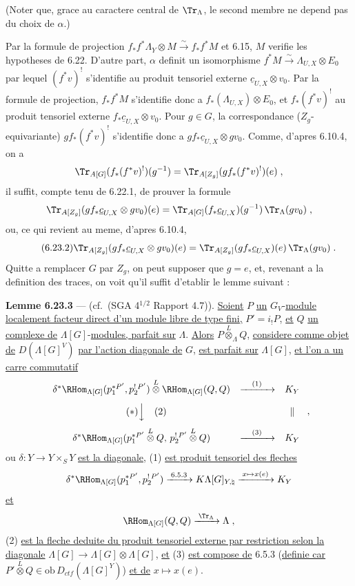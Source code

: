(Noter que, grace au caractere central de $\Tr_\Lambda$, le second membre ne depend pas du choix de $\alpha$.)

Par la formule de projection $f_* f^*\Lambda_Y \otimes M \xrightarrow{\sim} f_* f^* M$ et 6.15, $M$ verifie les hypotheses de 6.22. D'autre part, $\alpha$ definit un isomorphisme $f^* M \xrightarrow{\sim} \Lambda_{U,X} \otimes E_0$ par lequel $(f^* v)^!$ s'identifie au produit tensoriel externe $\underline{c}_{U,X} \otimes v_0$. Par la formule de projection, $f_* f^* M$ s'identifie donc a $f_*(\Lambda_{U,X}) \otimes E_0$, et $f_*(f^* v)^!$ au produit tensoriel externe $f_*\underline{c}_{U,X} \otimes v_0$. Pour $g \in G$, la correspondance ($Z_g$-equivariante) $gf_*(f^* v)^!$ s'identifie donc a $gf_*\underline{c}_{U,X} \otimes gv_0$. Comme, d'apres 6.10.4, on a
\[
\Tr_{A[G]}(f_*(f^* v)^!)(g^{-1}) = \Tr_{A[Z_g]}(gf_*(f^* v)^!)(e)\;,
\]
il suffit, compte tenu de 6.22.1, de prouver la formule
\[
\Tr_{A[Z_g]}(gf_*\underline{c}_{U,X} \otimes gv_0)(e) = \Tr_{A[G]}(f_*\underline{c}_{U,X})(g^{-1})\,\Tr_\Lambda(gv_0)\;,
\]
ou, ce qui revient au meme, d'apres 6.10.4,
\begin{equation}\tag{6.23.2}
\Tr_{A[Z_g]}(gf_*\underline{c}_{U,X} \otimes gv_0)(e) = \Tr_{A[Z_g]}(gf_*\underline{c}_{U,X})(e)\,\Tr_\Lambda(gv_0)\;.
\end{equation}
Quitte a remplacer $G$ par $Z_g$, on peut supposer que $g=e$, et, revenant a la definition des traces, on voit qu'il suffit d'etablir le lemme suivant :

\medskip
\noindent\textbf{Lemme 6.23.3} --- (cf.\ (SGA 4$^{1/2}$ Rapport 4.7)). \underline{Soient} $P$ \underline{un} $G_V$-\underline{module localement facteur direct d'un module libre de type fini,} $P' = i_!P$, \underline{et} $Q$ \underline{un complexe de} $\Lambda[G]$-\underline{modules, parfait sur} $\Lambda$. \underline{Alors} $P \overset{L}{\otimes}_\Lambda Q$, \underline{considere comme objet de} $D(\Lambda[G]^V)$ \underline{par l'action diagonale de} $G$, \underline{est parfait sur} $\Lambda[G]$, \underline{et l'on a un carre commutatif}
\[
\begin{array}{ccc}
\delta^*\RHom_{\Lambda[G]}(p_1^{*P'}, p_2^{!\,P'}) \overset{L}{\otimes} \RHom_{\Lambda[G]}(Q,Q) & \xrightarrow{\quad(1)\quad} & K_Y \\[8pt]
\llap{$(*)$}\Big\downarrow\rlap{\quad(2)} & & \parallel \\[10pt]
\delta^*\RHom_{\Lambda[G]}(p_1^{*P'} \overset{L}{\otimes} Q,\, p_2^{!\,P'} \overset{L}{\otimes} Q) & \xrightarrow{\quad(3)\quad} & K_Y
\end{array}\;,
\]
ou $\delta : Y \longrightarrow Y \times_S Y$ \underline{est la diagonale,} (1) \underline{est produit tensoriel des fleches}
\[
\delta^*\RHom_{\Lambda[G]}(p_1^{*P'}, p_2^{!\,P'}) \xrightarrow{\;6.5.3\;} K\Lambda[G]_{Y,\natural} \xrightarrow{\;x \mapsto x(e)\;} K_Y
\]
\underline{et}
\[
\RHom_{\Lambda[G]}(Q,Q) \xrightarrow{\;\Tr_\Lambda\;} \Lambda\;,
\]
(2) \underline{est la fleche deduite du produit tensoriel externe par restriction selon la diagonale} $\Lambda[G] \longrightarrow \Lambda[G] \otimes \Lambda[G]$, \underline{et} (3) \underline{est compose de} 6.5.3 (\underline{definie car} $P' \overset{L}{\otimes} Q \in \mathrm{ob}\, D_{ctf}(\Lambda[G]^Y)$) \underline{et de} $x \mapsto x(e)$.


